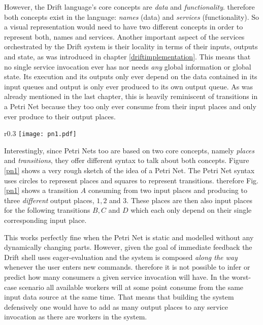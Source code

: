 However, the Drift language's core concepts are \textit{data}
and \textit{functionality}. therefore both concepts exist in
the language: \textit{names} (data) and \textit{services}
(functionality). So a visual representation would need to
have two different concepts in order to represent both, names
and services.
Another important aspect of the services orchestrated by the
Drift system is their locality in terms of their inputs, outputs and
state, as was introduced in chapter
\ref{driftimplementation}. This means that no single service
invocation ever has nor needs \textit{any} global information
or global state. Its execution and its outputs only ever depend
on the data contained in its input queues and output is only
ever produced to its own output queue. As was already mentioned
in the last chapter, this is heavily reminiscent of transitions
in a Petri Net because they too only ever consume from their
input places and only ever produce to their output places.

\begin{wrapfigure}{r}{0.3\textwidth}
  \texttt{[image: pn1.pdf]}
  \caption{Rough sketch example of a Petri Net.}
  \label{pn1}
\end{wrapfigure}

Interestingly, since Petri Nets too are based on two core concepts,
namely \textit{places} and \textit{transitions}, they offer different
syntax to talk about both concepts. Figure \ref{pn1} shows a very
rough sketch of the idea of a Petri Net. The Petri Net syntax
uses circles to represent places and squares to represent transitions.
therefore Fig.\ref{pn1} shows a transition $A$ consuming from two
input places and producing to three \textit{different} output places,
$1, 2$ and $3$. These places are then also input places for the
following transitions $B, C$ and $D$ which each only depend
on their single corresponding input place.

This works perfectly fine when the Petri Net is static and modelled
without any dynamically changing parts. However, given the goal
of immediate feedback the Drift shell uses eager-evaluation and
the system is composed \textit{along the way} whenever the user
enters new commands.
therefore it is not possible to infer or predict how many consumers
a given service invocation will have. In the worst-case scenario
all available workers will at some point consume from the
same input data source at the same time. That means that building the
system defensively one would have to add as many output places to any
service invocation as there are workers in the system.


